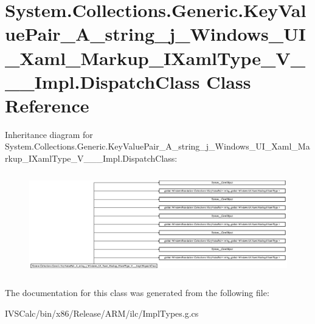 \hypertarget{class_system_1_1_collections_1_1_generic_1_1_key_value_pair___a__string__j___windows___u_i___xamf8d424f5f185181c50f778c3f7702856}{}\section{System.\+Collections.\+Generic.\+Key\+Value\+Pair\+\_\+\+A\+\_\+string\+\_\+j\+\_\+\+Windows\+\_\+\+U\+I\+\_\+\+Xaml\+\_\+\+Markup\+\_\+\+I\+Xaml\+Type\+\_\+\+V\+\_\+\+\_\+\+\_\+\+Impl.\+Dispatch\+Class Class Reference}
\label{class_system_1_1_collections_1_1_generic_1_1_key_value_pair___a__string__j___windows___u_i___xamf8d424f5f185181c50f778c3f7702856}
Inheritance diagram for System.\+Collections.\+Generic.\+Key\+Value\+Pair\+\_\+\+A\+\_\+string\+\_\+j\+\_\+\+Windows\+\_\+\+U\+I\+\_\+\+Xaml\+\_\+\+Markup\+\_\+\+I\+Xaml\+Type\+\_\+\+V\+\_\+\+\_\+\+\_\+\+Impl.\+Dispatch\+Class\+:\begin{figure}[H]
\begin{center}
\leavevmode
\includegraphics[height=4.463768cm]{class_system_1_1_collections_1_1_generic_1_1_key_value_pair___a__string__j___windows___u_i___xamf8d424f5f185181c50f778c3f7702856}
\end{center}
\end{figure}


The documentation for this class was generated from the following file\+:\begin{DoxyCompactItemize}
\item 
I\+V\+S\+Calc/bin/x86/\+Release/\+A\+R\+M/ilc/Impl\+Types.\+g.\+cs\end{DoxyCompactItemize}
